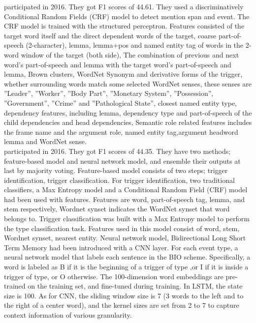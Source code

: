 \indent \cite{liu2016event} participated in 2016. They got F1 scores of 44.61. They used a discriminatively Conditional Random Fields (CRF) model to detect mention span and event. The CRF model is trained with the structured perceptron. Features consisted of the target word itself and the direct dependent words of the target, coarse part-of-speech (2-character), lemma, lemma+pos and named entity tag of words in the 2-word window of the target (both side), The combination of previous and next word’s part-of-speech and lemma with the target word’s part-of-speech and lemma, Brown clusters, WordNet Synonym and derivative forms of the trigger, whether surrounding words match some selected WordNet senses, these senses are ”Leader”, ”Worker”, ”Body Part”, ”Monetary System”, ”Possession”, ”Government”, ”Crime” and ”Pathological State”, closest named entity type, dependency features, including lemma, dependency type and part-of-speech of the child dependencies and head dependencies, Semantic role related features includes the frame name and the argument role, named entity tag,argument headword lemma and WordNet sense.\\
\indent \cite{zeng2016event} participated in 2016. They got F1 scores of 44.35. They have two methods; feature-based model and neural network model, and ensemble their outputs at last by majority voting. Feature-based model consists of two steps; trigger identiﬁcation, trigger classification. For trigger identification, two traditional classiﬁers, a Max Entropy model and a Conditional Random Field (CRF) model had been used with features. Features are word, part-of-speech tag, lemma, and stem respectively, Wordnet synset indicates the WordNet synset that word belongs to. Trigger classiﬁcation was built with a Max Entropy model to perform the type classiﬁcation task. Features used in this model consist of  word, stem, Wordnet synset, nearest entity. Neural network model, Bidirectional Long Short Term Memory had been introduced with a CNN layer. For each event type, a neural network model that labels each sentence in the BIO scheme. Speciﬁcally, a word is labeled as B if it is the beginning of a trigger of type ,or I if it is inside a trigger of type, or O otherwise. The 100-dimension word embeddings are pre-trained on the training set, and fine-tuned during training. In LSTM, the state size is 100. As for CNN, the sliding window size is 7 (3 words to the left and to the right of a center word), and the kernel sizes are set from 2 to 7 to capture context information of various granularity.\\

